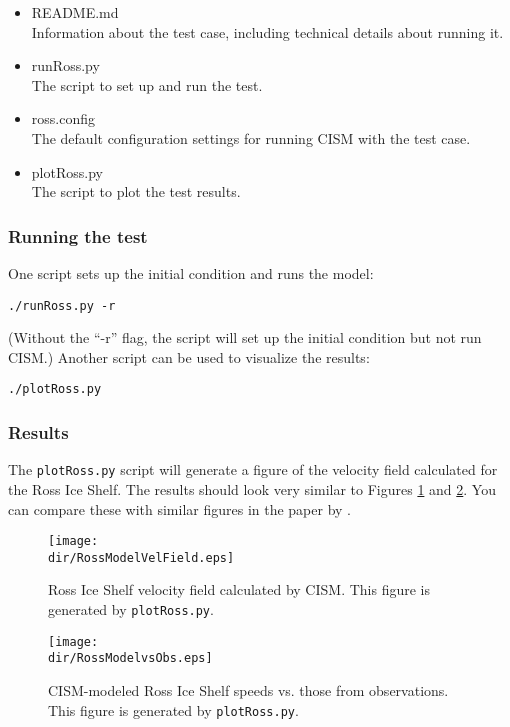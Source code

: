 \begin{itemize}
	\item README.md \\
		Information about the test case, including technical details about running it.
	\item runRoss.py \\
		The script to set up and run the test.
	\item ross.config \\
  The default configuration settings for running CISM with the test case.
	\item plotRoss.py \\
		The script to plot the test results.
\end{itemize}

\subsubsection{Running the test}
One script sets up the initial condition and runs the model:

\texttt{./runRoss.py -r}

\noindent
(Without the ``-r'' flag, the script will set up the initial condition but not run CISM.)
Another script can be used to visualize the results:

\texttt{./plotRoss.py}

\subsubsection{Results}
The \texttt{plotRoss.py} script will generate a figure of the velocity field
calculated for the Ross Ice Shelf.  The results should look very similar to Figures \ref{fig:rossresults1} and \ref{fig:rossresults2}. You can
compare these with similar figures in the paper by \citet{MacAyeal:1996vn}.

\begin{figure}[H!]
	\centering
	\texttt{[image: \\dir/RossModelVelField.eps]}
	\caption{Ross Ice Shelf velocity field calculated by CISM. This figure is generated by \texttt{plotRoss.py}.}
	\label{fig:rossresults1}
\end{figure}

\begin{figure}[H!]
	\centering
	\texttt{[image: \\dir/RossModelvsObs.eps]}
	\caption{CISM-modeled Ross Ice Shelf speeds vs. those from observations. This figure is generated by \texttt{plotRoss.py}.}
	\label{fig:rossresults2}
\end{figure}
\FloatBarrier


